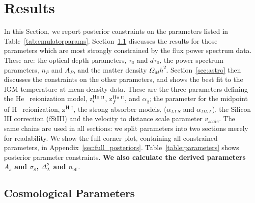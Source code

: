 \section{Results}\label{sec:results}

In this Section, we report posterior constraints on the parameters listed in Table~\ref{tab:emulatorparams}.
Section~\ref{sec:cosmo} discusses the results for those parameters which are most strongly constrained by the flux power spectrum data.
These are: the optical depth parameters, $\tau_0$ and $d\tau_0$, the power spectrum parameters, $n_P$ and $A_P$, and the matter density $\Omega_M h^2$.
Section~\ref{sec:astro} then discusses the constraints on the other parameters, and shows the best fit to the IGM temperature at mean density data.
These are the three parameters defining the He~{} reionization model, z$^{\text{He~{\sc ii}}}_i$, z$^{\text{He~{\sc ii}}}_f$, and $\alpha_q$; the parameter for the midpoint of H~{} reionization, z$^{\text{H~{\sc i}}}$, the strong absorber models, ($\alpha_{LLS}$ and $\alpha_{DLA}$), the Silicon III correction (fSiIII) and the velocity to distance scale parameter $v_{scale}$.
The same chains are used in all sections: we split parameters into two sections merely for readability.
We show the full corner plot, containing all constrained parameters, in Appendix~\ref{sec:full_posteriors}.
Table~\ref{table:parameters} shows posterior parameter constraints. \textbf{We also calculate the derived parameters $A_s$ and $\sigma_8$, $\Delta_L^2$ and $n_\mathrm{eff}$}.


\subsection{Cosmological Parameters}\label{sec:cosmo}

